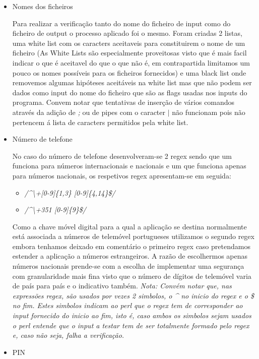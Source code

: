 \begin{itemize}
\item Nomes dos ficheiros\newline
\par Para realizar a verificação tanto do nome do ficheiro de input como do ficheiro de output o processo aplicado foi o mesmo. Foram criadas 2 listas, uma white list com os caracters aceitaveis para constituirem o nome de um ficheiro (As White Lists são especialmente proveitosas visto que é mais facil indicar o que é aceitavel do que o que não é, em contrapartida limitamos um pouco os nomes possíveis para os ficheiros fornecidos) e uma black list onde removemos algumas hipóteses aceitáveis na white list mas que não podem ser dados como input do nome do ficheiro que são as flags usadas nos inputs do programa.\newline
 Convem notar que tentativas de inserção de vários comandos através da adição de \textit{;} ou de pipes com o caracter \textit{$\mid$} não funcionam pois não pertencem á lista de caracters permitidos pela white list.

\hfill\newline
\item Número de telefone\newline
\par No caso do número de telefone desenvolveram-se 2 regex sendo que um funciona para números internacionais e nacionais e um que funciona apenas para números nacionais, os respetivos regex apresentam-se em seguida:\newline
\begin{itemize}
	\item \textit{/\^{}\textbackslash+[0-9]\{1,3\} [0-9]\{4,14\}\$/}
	\item \textit{/\^{}\textbackslash+351 [0-9]\{9\}\$/}
\end{itemize}

\hfill\newline
\par Como a chave móvel digital para a qual a aplicação se destina normalmente está associada a números de telemóvel portugueses utilizamos o segundo regex embora tenhamos deixado em comentário o primeiro regex caso pretendamos estender a aplicação a números estrangeiros. A razão de escolhermos apenas números nacionais prende-se com a escolha de implementar uma segurança com granularidade mais fina visto que o número de dígitos de telemóvel varia de país para país e o indicativo também.\newline
\textit{Nota: Convém notar que, nas expressões regex, são usados por vezes 2 simbolos, o \^{} no inicio do regex e o \$ no fim. Estes simbolos indicam ao perl que o regex tem de corresponder ao input fornecido do inicio ao fim, isto é, caso ambos os simbolos sejam usados o perl entende que o input a testar tem de ser totalmente formado pelo regex e, caso não seja, falha a verificação.}\newline
\hfill\newline
\item PIN\newline


\end{itemize}
